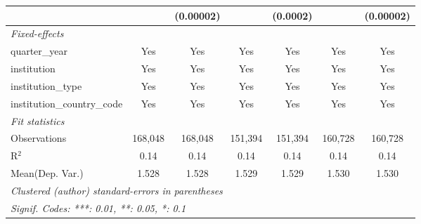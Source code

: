 \begin{tabular}{lcccccc}
                                      &               & (0.00002)     &               & (0.0002)      &               & (0.00002)\\   
   \midrule
   \emph{Fixed-effects}\\
   quarter\_year                      & Yes           & Yes           & Yes           & Yes           & Yes           & Yes\\  
   institution                        & Yes           & Yes           & Yes           & Yes           & Yes           & Yes\\  
   institution\_type                  & Yes           & Yes           & Yes           & Yes           & Yes           & Yes\\  
   institution\_country\_code         & Yes           & Yes           & Yes           & Yes           & Yes           & Yes\\  
   \midrule
   \emph{Fit statistics}\\
   Observations                       & 168,048       & 168,048       & 151,394       & 151,394       & 160,728       & 160,728\\  
   R$^2$                              & 0.14          & 0.14          & 0.14          & 0.14          & 0.14          & 0.14\\  
Mean(Dep. Var.) & 1.528 & 1.528 & 1.529 & 1.529 & 1.530 & 1.530 \\
   \midrule \midrule
   \multicolumn{7}{l}{\emph{Clustered (author) standard-errors in parentheses}}\\
   \multicolumn{7}{l}{\emph{Signif. Codes: ***: 0.01, **: 0.05, *: 0.1}}\\
\end{tabular}
\par\endgroup
